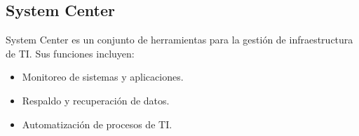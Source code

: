 \subsection{System Center}

System Center es un conjunto de herramientas para la gestión de infraestructura
de TI. Sus funciones incluyen:
\begin{itemize}
    \item Monitoreo de sistemas y aplicaciones.
    \item Respaldo y recuperación de datos.
    \item Automatización de procesos de TI.
\end{itemize}